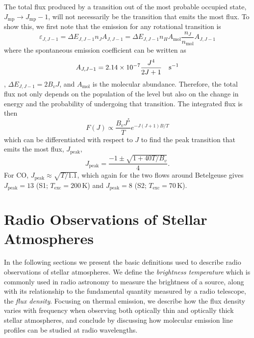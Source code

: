 The total flux produced by a transition out of the most probable occupied state, $J_{\mathrm{mp}}\rightarrow J_{\mathrm{mp}}-1$, will not necessarily be the transition that emits the most flux. To show this, we first note that the emission for any rotational transition is
\begin{equation}
\varepsilon _{J,J-1}=\Delta E_{J,J-1}n_{J}A_{{J,J-1}} = \Delta E_{J,J-1}n_{H}A_{\mathrm{mol}}\frac{n_{J}}{n_{\mathrm{mol}}}A_{{J,J-1}}
\end{equation}
where the spontaneous emission coefficient can be written as
\begin{equation}
A_{J,J-1} =2.14\times 10^{-7}\frac{J^4}{2J+1} \ \ \ \rm{s}^{-1}
\end{equation}\label{eq:1.27aa}
\citep{draine_2011}, $\Delta E_{J,J-1}=2B_{v}J$, and $A_{\mathrm{mol}}$ is the molecular abundance. Therefore, the total flux not only depends on the population of the level but also on the change in energy and the probability of undergoing that transition. The integrated flux is then
\begin{equation}
F(J)\propto \frac{B_{v}J^5}{T}e^{-J(J+1)B/T}
\end{equation}
which can be differentiated with respect to $J$ to find the peak transition that emits the most flux, $J_{\mathrm{peak}}$,
\begin{equation}
J_{\mathrm{peak}} = \frac{-1 \pm \sqrt{1+40T/B_{v}}}{4}.
\end{equation}
For CO, $J_{\mathrm{peak}} \approx \sqrt{T/1.1}$, which again for the two flows around Betelgeuse gives $J_{\mathrm{peak}}=13$ (S1; $T_{\mathrm{exc}}=200$\,K) and $J_{\mathrm{peak}}=8$ (S2; $T_{\mathrm{exc}}=70$\,K). 

\section{Radio Observations of Stellar Atmospheres}\label{sec:1.8}
In the following sections we present the basic definitions used to describe radio observations of stellar atmospheres. We define the \textit{brightness temperature} which is commonly used in radio astronomy to measure the brightness of a source, along with its relationship to the fundamental quantity measured by a radio telescope, the \textit{flux density}. Focusing on thermal emission, we describe how the flux density varies with frequency when observing both optically thin and optically thick stellar atmospheres, and conclude by discussing how molecular emission line profiles can be studied at radio wavelengths.

